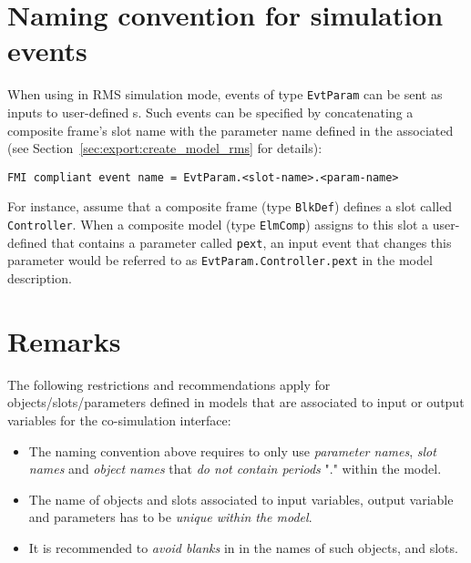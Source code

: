 \section{Naming convention for simulation events}
\label{sec:naming_convention:sim_evt}

When using \pf in RMS simulation mode, events of type \texttt{EvtParam} can be sent as inputs to user-defined {\dslmodel}s.
Such events can be specified by concatenating a composite frame's slot name with the parameter name defined in the associated \dslmodel (see Section~\ref{sec:export:create_model_rms} for details):
\begin{verbatim}
FMI compliant event name = EvtParam.<slot-name>.<param-name>
\end{verbatim}

For instance, assume that a composite frame (type \texttt{BlkDef}) defines a slot called \texttt{Controller}. When a composite model (type \texttt{ElmComp}) assigns to this slot a user-defined \dslmodel that contains a parameter called \texttt{pext}, an input event that changes this parameter would be referred to as \texttt{EvtParam.Controller.pext} in the model description.


\section{Remarks}

The following restrictions and recommendations apply for objects/slots/parameters defined in \pf models that are associated to input or output variables for the co-simulation interface:
\begin{itemize}
  \item The naming convention above requires to only use \emph{parameter names}, \emph{slot names} and \emph{object names} that \emph{do not contain periods} "." within the \pf model.
  \item The name of objects and slots associated to input variables, output variable and parameters has to be \emph{unique within the model}.
  \item It is recommended to \emph{avoid blanks} in in the names of such objects, and slots.
\end{itemize}
